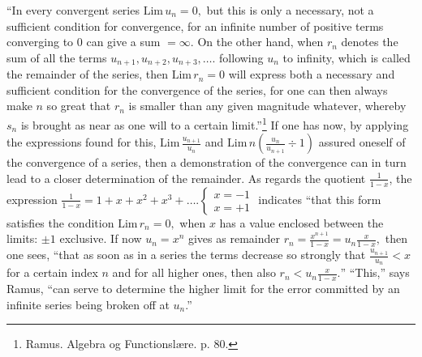 \documentclass[12pt,a4paper,openany]{book}
\newcommand{\opage}[1]{\marginnote{\footnotesize\textit{[#1]}}}
\begin{document}
``In every convergent series $\mathrm{Lim}\,u_{n}=0,$ but this is only a necessary, not a sufficient condition for convergence, for an infinite number of positive terms converging to $0$ can give a sum $=\infty.$ On the other hand, when $r_{n}$ denotes the sum of all the terms $u_{n+1},u_{n+2},u_{n+3},\ldots.$ following $u_{n}$ to infinity, which is called the remainder of the series, then $\mathrm{Lim}\,r_{n}=0$ will express both a necessary and sufficient condition for the convergence of the series, for one can then always make $n$ so great that $r_{n}$ is smaller than any given magnitude whatever, whereby $s_{n}$ is brought as near as one will to a certain limit.''\footnote[1]{Ramus. Algebra og Functionslære. p. 80.}
If one has now, by applying the expressions found for this, $\mathrm{Lim}\,\frac{u_{n+1}}{u_{n}}$ and $\mathrm{Lim}\,n\left(\frac{u_{n}}{u_{n+1}}\div1\right)$ assured oneself of the convergence of a series, then a demonstration of the convergence can in turn lead to a closer determination of the remainder. As regards the quotient $\frac{1}{1-x}$, the expression $\frac{1}{1-x}=1+x+x^{2}+x^{3}+\ldots.\left\{\begin{array}{l}x=-1\\x=+1\end{array}\right.$ indicates ``that this form
\setcounter{footnote}{0}%
\opage{62}satisfies the condition $\mathrm{Lim}\,r_{n}=0,$ when $x$ has a value enclosed between the limits: $\pm1$ exclusive. If now $u_{n}=x^{n}$ gives as remainder $r_{n}=\frac{x^{n+1}}{1-x}=u_{n}\frac{x}{1-x},$ then one sees, ``that as soon as in a series the terms decrease so strongly that $\frac{u_{n+1}}{u_{n}}<x$ for a certain index $n$ and for all higher ones, then also $r_{n}<u_{n}\frac{x}{1-x}.$'' ``This,'' says Ramus, ``can serve to determine the higher limit for the error committed by an infinite series being broken off at $u_{n}$.''
\end{document}
